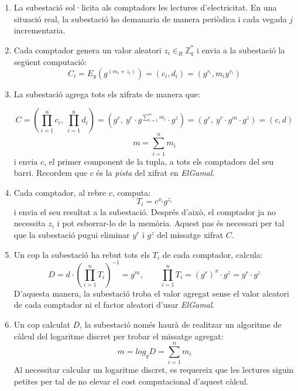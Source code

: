 \begin{enumerate}
	\item La subestació sol·licita als comptadors les lectures d'electricitat. En una situació real, la subestació ho demanaria de manera periòdica i cada vegada $j$ incrementaria.
	\item Cada comptador genera un valor aleatori $z_i \in_R {\mathbb{Z}_{q}^*}$ i envia a la subestació la següent computació: 
	\[C_i = E_y(g^{(m_i + z_i)}) = (c_i, d_i) = (g^{r_i}, m_i y^{r_i})\]
	\item La subestació agrega tots els xifrats de manera que:
	
	\[C = (\prod_{i=1}^{n} c_i, \ \prod_{i=1}^{n} d_i) = (g^r, \ y^r \cdot g ^{\sum_{i=1}^{n} m_i} \cdot g^z) = (g^r, \ y^r \cdot g^m \cdot g^z ) =  (c, d)\]
	\[m = \sum_{i=1}^{n} m_i\]
	i envia $c$, el primer component de la tupla, a tots els comptadors del seu barri. Recordem que $c$ és la \textit{pista} del xifrat en \textit{ElGamal}.
	\label{en:busom-s1}
	\item Cada comptador, al rebre $c$, computa:
	\[T_i = c^{x_i} g^{z_i}\]
	i envia el seu resultat a la subestació. Després d'això, el comptador ja no necessita $z_i$ i pot esborrar-lo de la memòria. Aquest pas és necessari per tal que la subestació pugui eliminar $y^r$ i $g^z$ del missatge xifrat $C$.\label{en:busom-m1}
	\item Un cop la subestació ha rebut tots els $T_i$ de cada comptador, calcula:
	\[D = d \cdot (\prod_{i=1}^{n} T_i)^{-1} = g^m, \qquad \prod_{i=1}^{n} T_i = (g^{r})^x \cdot g^z = y^r \cdot g^z\]
	D'aquesta manera, la subestació troba el valor agregat sense el valor aleatori de cada comptador ni el factor aleatori d'usar \textit{ElGamal}.
	\item Un cop calculat $D$, la subestació només haurà de realitzar un algoritme de càlcul del logaritme discret per trobar el missatge agregat:
	\[m = log_g D = \sum_{i=1}^{n} m_i\]
	Al necessitar calcular un logaritme discret, es requereix que les lectures siguin petites per tal de no elevar el cost computacional d'aquest càlcul.
\end{enumerate}
